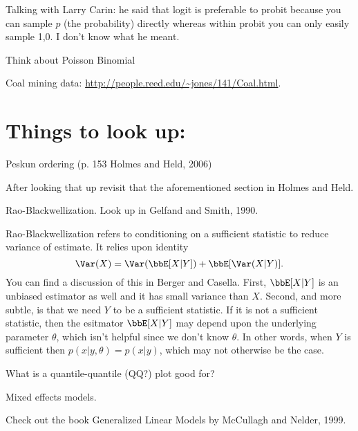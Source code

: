 \documentclass{article}
\begin{document}
\begin{outline}

\1 Talking with Larry Carin: he said that logit is preferable to probit because
you can sample $p$ (the probability) directly whereas within probit you can only
easily sample 1,0.  I don't know what he meant.

\1 Think about Poisson Binomial

\1 Coal mining data: \url{http://people.reed.edu/~jones/141/Coal.html}.

\end{outline}

\section{Things to look up:}

\begin{outline}

\1 Peskun ordering (p. 153 Holmes and Held, 2006)

  \2 After looking that up revisit that the aforementioned section in Holmes and
  Held.

\1 Rao-Blackwellization.  Look up in Gelfand and Smith, 1990.

\2 Rao-Blackwellization refers to conditioning on a sufficient statistic to
reduce variance of estimate.  It relies upon identity
\[
\Var(X) = \Var(\bbE[X|Y]) + \bbE[\Var(X|Y)].
\]
You can find a discussion of this in Berger and Casella.  First, $\bbE[X|Y]$ is
an unbiased estimator as well and it has small variance than $X$.  Second, and
more subtle, is that we need $Y$ to be a sufficient statistic.  If it is not a
sufficient statistic, then the esitmator $\bbE[X|Y]$ may depend upon the
underlying parameter $\theta$, which isn't helpful since we don't know $\theta$.
In other words, when $Y$ is sufficient then $p(x | y, \theta) = p(x | y)$, which
may not otherwise be the case.


\1 What is a quantile-quantile (QQ?) plot good for?

\1 Mixed effects models.

\1 Check out the book Generalized Linear Models by McCullagh and Nelder, 1999.

\end{outline}

{}

\end{document}
